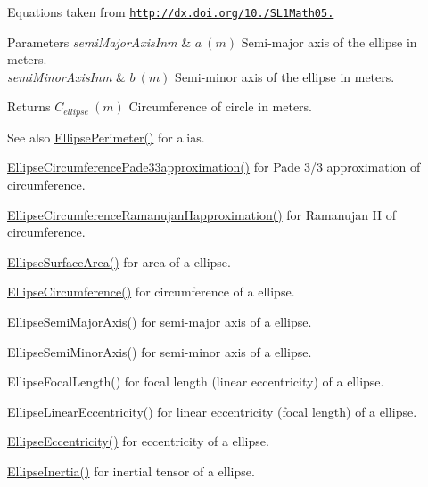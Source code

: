 Equations taken from \href{http://dx.doi.org/10.3247/SL1Math05.004}{\tt http\+://dx.\+doi.\+org/10./\+S\+L1\+Math05.} 
\begin{DoxyParams}{Parameters}
{\em semi\+Major\+Axis\+Inm} & $ a\ (m)$ Semi-\/major axis of the ellipse in meters. \\
\hline
{\em semi\+Minor\+Axis\+Inm} & $ b\ (m)$ Semi-\/minor axis of the ellipse in meters. \\
\hline
\end{DoxyParams}
\begin{DoxyReturn}{Returns}
$ C_{ellipse}\ (m)$ Circumference of circle in meters. 
\end{DoxyReturn}
\begin{DoxySeeAlso}{See also}
\mbox{\hyperlink{group___e_g_x_math-_geometry-2_d-_ellipse_ga2d4ee70e08d6fb4b56209ad4fc3f38ca}{Ellipse\+Perimeter()}} for alias. 

\mbox{\hyperlink{group___e_g_x_math-_geometry-2_d-_ellipse_ga0e0b290f1da2605c16ec13b9e221769d}{Ellipse\+Circumference\+Pade33approximation()}} for Pade 3/3 approximation of circumference. 

\mbox{\hyperlink{group___e_g_x_math-_geometry-2_d-_ellipse_gaa908406db81fadc7c2d73e4e113d24d7}{Ellipse\+Circumference\+Ramanujan\+I\+Iapproximation()}} for Ramanujan II of circumference. 

\mbox{\hyperlink{group___e_g_x_math-_geometry-2_d-_ellipse_ga4ce8c8323e9718ce5458f4ab7f6d823d}{Ellipse\+Surface\+Area()}} for area of a ellipse. 

\mbox{\hyperlink{group___e_g_x_math-_geometry-2_d-_ellipse_ga4172802ac674eb53467b44928ac635c7}{Ellipse\+Circumference()}} for circumference of a ellipse. 

Ellipse\+Semi\+Major\+Axis() for semi-\/major axis of a ellipse. 

Ellipse\+Semi\+Minor\+Axis() for semi-\/minor axis of a ellipse. 

Ellipse\+Focal\+Length() for focal length (linear eccentricity) of a ellipse. 

Ellipse\+Linear\+Eccentricity() for linear eccentricity (focal length) of a ellipse. 

\mbox{\hyperlink{group___e_g_x_math-_geometry-2_d-_ellipse-_eccentricity_ga6a0a7fba17f782616894cfc447628c33}{Ellipse\+Eccentricity()}} for eccentricity of a ellipse. 

\mbox{\hyperlink{group___e_g_x_math-_geometry-2_d-_ellipse_gad679a65dc7550e27dc69c1d328c94732}{Ellipse\+Inertia()}} for inertial tensor of a ellipse. 
\end{DoxySeeAlso}
\mbox{\label{group___e_g_x_math-_geometry-2_d-_ellipse_ga0e0b290f1da2605c16ec13b9e221769d}} 
